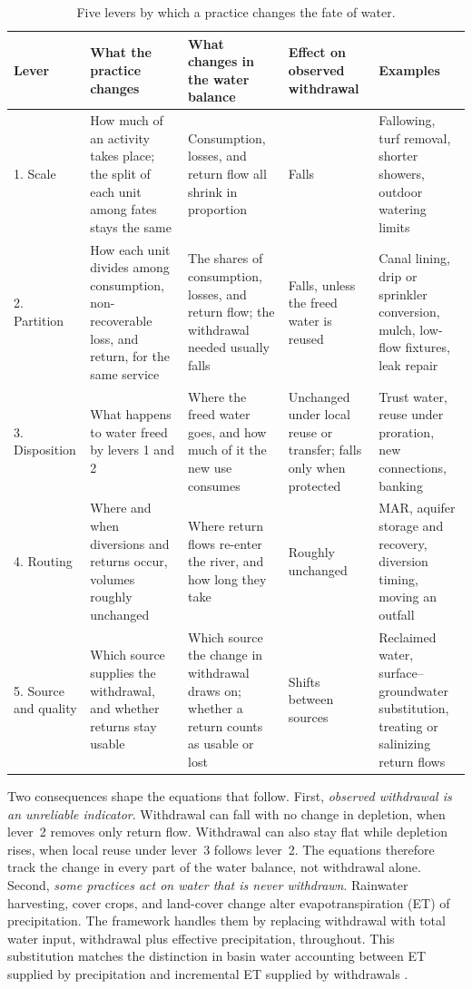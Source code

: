 \documentclass[11pt]{article}
\begin{document}
\begin{table}[htbp]
\centering
\caption{Five levers by which a practice changes the fate of water.}\label{tab:levers}
\footnotesize
\begin{tabularx}{\textwidth}{@{}P{1.6cm}LLP{2.6cm}L@{}}
\toprule
Lever & What the practice changes & What changes in the water balance & Effect on observed withdrawal & Examples \\
. Scale & How much of an activity takes place; the split of each unit among fates stays the same & Consumption, losses, and return flow all shrink in proportion & Falls & Fallowing, turf removal, shorter showers, outdoor watering limits \\
2. Partition & How each unit divides among consumption, non-recoverable loss, and return, for the same service & The shares of consumption, losses, and return flow; the withdrawal needed usually falls & Falls, unless the freed water is reused & Canal lining, drip or sprinkler conversion, mulch, low-flow fixtures, leak repair \\
3. Disposition & What happens to water freed by levers 1 and 2 & Where the freed water goes, and how much of it the new use consumes & Unchanged under local reuse or transfer; falls only when protected & Trust water, reuse under proration, new connections, banking \\
4. Routing & Where and when diversions and returns occur, volumes roughly unchanged & Where return flows re-enter the river, and how long they take & Roughly unchanged & MAR, aquifer storage and recovery, diversion timing, moving an outfall \\
5. Source and quality & Which source supplies the withdrawal, and whether returns stay usable & Which source the change in withdrawal draws on; whether a return counts as usable or lost & Shifts between sources & Reclaimed water, surface--groundwater substitution, treating or salinizing return flows \\
\bottomrule
\end{tabularx}
\end{table}

Two consequences shape the equations that follow. First, \emph{observed withdrawal is an unreliable indicator}. Withdrawal can fall with no change in depletion, when lever~2 removes only return flow. Withdrawal can also stay flat while depletion rises, when local reuse under lever~3 follows lever~2. The equations therefore track the change in every part of the water balance, not withdrawal alone. Second, \emph{some practices act on water that is never withdrawn}. Rainwater harvesting, cover crops, and land-cover change alter evapotranspiration (ET) of precipitation. The framework handles them by replacing withdrawal with total water input, withdrawal plus effective precipitation, throughout. This substitution matches the distinction in basin water accounting between ET supplied by precipitation and incremental ET supplied by withdrawals \citep{karimi2013}.
\end{document}
